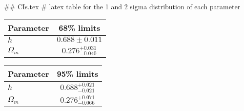 ## CIs.tex
# latex table for the 1 and 2 sigma distribution of each parameter

\begin{tabular} { l  c}
 Parameter &  68\% limits\\
\hline
{\boldmath$h              $} & $0.688\pm 0.011            $\\
{\boldmath$\Omega_m       $} & $0.276^{+0.031}_{-0.040}   $\\
\hline
\end{tabular}

\begin{tabular} { l  c}
 Parameter &  95\% limits\\
\hline
{\boldmath$h              $} & $0.688^{+0.021}_{-0.021}   $\\
{\boldmath$\Omega_m       $} & $0.276^{+0.071}_{-0.066}   $\\
\hline
\end{tabular}
